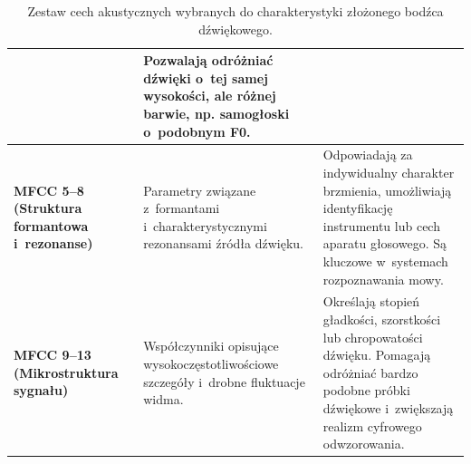\documentclass{article}
\begin{document}
\begin{table}[H]
\begin{tabularx}{\textwidth}{@{}>{\bfseries}p{3.2cm}LL@{}}
& Pozwalają odróżniać dźwięki o~tej samej wysokości, ale różnej barwie, np. samogłoski o~podobnym F0. \\
\midrule
MFCC 5--8 (Struktura formantowa i~rezonanse)
& Parametry związane z~formantami i~charakterystycznymi rezonansami źródła dźwięku.
& Odpowiadają za indywidualny charakter brzmienia, umożliwiają identyfikację instrumentu lub cech aparatu głosowego. Są kluczowe w~systemach rozpoznawania mowy. \\
\midrule
MFCC 9--13 (Mikrostruktura sygnału)
& Współczynniki opisujące wysokoczęstotliwościowe szczegóły i~drobne fluktuacje widma.
& Określają stopień gładkości, szorstkości lub chropowatości dźwięku. Pomagają odróżniać bardzo podobne próbki dźwiękowe i~zwiększają realizm cyfrowego odwzorowania. \\
\bottomrule
\end{tabularx}
\caption{Zestaw cech akustycznych wybranych do charakterystyki złożonego bodźca dźwiękowego.}
\label{tab:parametry-akustyczne}
\end{table}


\end{document}
